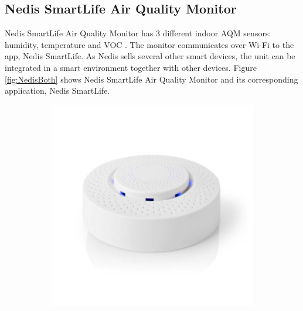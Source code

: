 \subsection{Nedis SmartLife Air Quality Monitor}
Nedis SmartLife Air Quality Monitor has 3 different indoor \gls{AQM} sensors: humidity, temperature and VOC \cite{NedisDevice}. The monitor communicates over \gls{Wi-Fi} to the app, Nedis SmartLife. As Nedis sells several other smart devices, the unit can be integrated in a smart environment together with other devices. Figure \ref{fig:NedisBoth} shows Nedis SmartLife Air Quality Monitor and its corresponding application, Nedis SmartLife. 
\begin{figure} [H]
    \centering
    \begin{subfigure}{0.3\textwidth}
         \centering
         \includegraphics[width=1\textwidth]{figures/NedisDevice.jpg}
         \label{fig:NedisApp}
     \end{subfigure}
     \hspace{1cm}
      \begin{subfigure}{0.3\textwidth}
         \centering

\end{subfigure}
\end{figure}

